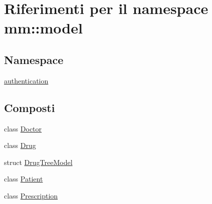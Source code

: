 \hypertarget{namespacemm_1_1model}{}\section{Riferimenti per il namespace mm\+:\+:model}
\label{namespacemm_1_1model}
\subsection*{Namespace}
\begin{DoxyCompactItemize}
\item 
 \mbox{\hyperlink{namespacemm_1_1model_1_1authentication}{authentication}}
\end{DoxyCompactItemize}
\subsection*{Composti}
\begin{DoxyCompactItemize}
\item 
class \mbox{\hyperlink{classmm_1_1model_1_1_doctor}{Doctor}}
\item 
class \mbox{\hyperlink{classmm_1_1model_1_1_drug}{Drug}}
\item 
struct \mbox{\hyperlink{structmm_1_1model_1_1_drug_tree_model}{Drug\+Tree\+Model}}
\item 
class \mbox{\hyperlink{classmm_1_1model_1_1_patient}{Patient}}
\item 
class \mbox{\hyperlink{classmm_1_1model_1_1_prescription}{Prescription}}
\end{DoxyCompactItemize}
